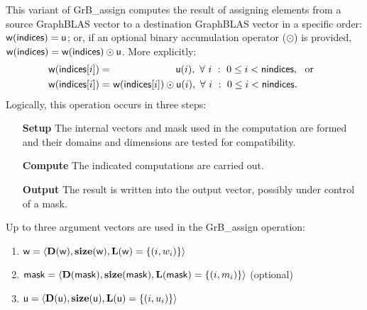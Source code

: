 This variant of {\sf GrB\_assign} computes the result of assigning elements from
a source GraphBLAS vector to a destination GraphBLAS vector in a specific order:
${\sf w}({\sf indices}) = {\sf u}$; or, if an optional binary accumulation 
operator ($\odot$) is provided, 
${\sf w}({\sf indices}) = {\sf w}({\sf indices}) \odot {\sf u}$. 
More explicitly:
\[
\begin{aligned}
    {\sf w}({\sf indices}[i]) = &\ \ \ \ \ \ \ \ \ \ \ \ \ \ \ \ \ \ \ \ {\sf u}(i),
    \ \forall \ i \ : \ 0 \leq i < {\sf nindices}, \mbox{~~or~~}
    \\
    {\sf w}({\sf indices}[i]) = &\ {\sf w}({\sf indices}[i]) \odot {\sf u}(i),
    \ \forall \ i \ : \ 0 \leq i < {\sf nindices}.
\end{aligned}
\]
Logically, this operation occurs in three steps:
\begin{enumerate}[leftmargin=0.75in]
\item[\bf Setup] The internal vectors and mask used in the computation are formed 
and their domains and dimensions are tested for compatibility.
\item[\bf Compute] The indicated computations are carried out.
\item[\bf Output] The result is written into the output vector, possibly under 
control of a mask.
\end{enumerate}

Up to three argument vectors are used in the {\sf GrB\_assign} operation:
\begin{enumerate}
	\item ${\sf w} = \langle \bold{D}({\sf w}),\bold{size}({\sf w}),
    \bold{L}({\sf w}) = \{(i,w_i) \} \rangle$

	\item ${\sf mask} = \langle \bold{D}({\sf mask}),\bold{size}({\sf mask}),
    \bold{L}({\sf mask}) = \{(i,m_i) \} \rangle$ (optional)

	\item ${\sf u} = \langle \bold{D}({\sf u}),\bold{size}({\sf u}),
    \bold{L}({\sf u}) = \{(i,u_i) \} \rangle$
\end{enumerate}

